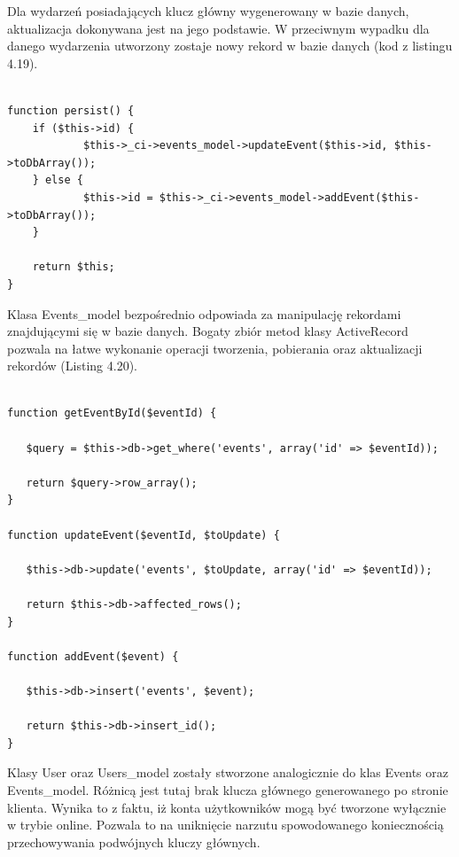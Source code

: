 Dla wydarzeń posiadających klucz główny wygenerowany w bazie danych, aktualizacja dokonywana jest na jego podstawie. W przeciwnym wypadku dla danego wydarzenia utworzony zostaje nowy rekord w bazie danych (kod z listingu 4.19).

\begin{lstlisting}[caption=Aktualizacja obiektu Event w bazie danych., label=amb, captionpos=b]

function persist() {
   	if ($this->id) {
       		$this->_ci->events_model->updateEvent($this->id, $this->toDbArray());
   	} else {
       		$this->id = $this->_ci->events_model->addEvent($this->toDbArray());
   	}

   	return $this;
}

\end{lstlisting}

Klasa Events\_model bezpośrednio odpowiada za manipulację rekordami znajdującymi się w bazie danych. Bogaty zbiór metod klasy ActiveRecord pozwala na łatwe wykonanie operacji tworzenia, pobierania oraz aktualizacji rekordów (Listing 4.20).

\begin{lstlisting}[caption=Przykładowe metody klasy Events\_model odpowiedzialne za komunikację z bazą danych., label=amb, captionpos=b]

function getEventById($eventId) {
	
   $query = $this->db->get_where('events', array('id' => $eventId));

   return $query->row_array();
}

function updateEvent($eventId, $toUpdate) {

   $this->db->update('events', $toUpdate, array('id' => $eventId));

   return $this->db->affected_rows();
}

function addEvent($event) {
   	
   $this->db->insert('events', $event);

   return $this->db->insert_id();
}

\end{lstlisting}

Klasy User oraz Users\_model zostały stworzone analogicznie do klas Events oraz Events\_model. Różnicą jest tutaj brak klucza głównego generowanego po stronie klienta. Wynika to z faktu, iż konta użytkowników mogą być tworzone wyłącznie w trybie online. Pozwala to na uniknięcie narzutu spowodowanego koniecznością przechowywania podwójnych kluczy głównych.

